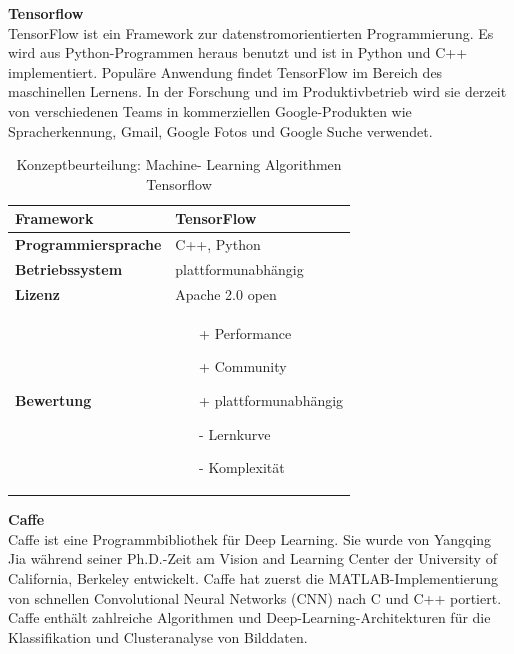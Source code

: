 \documentclass[../../main.tex]{subfiles}
\begin{document}
        \textbf{Tensorflow}\\
        TensorFlow ist ein Framework zur datenstromorientierten Programmierung. Es wird aus Python-Programmen heraus benutzt und ist in Python und C++ implementiert. Populäre Anwendung findet TensorFlow im Bereich des maschinellen Lernens. In der Forschung und im Produktivbetrieb wird sie derzeit von verschiedenen Teams in kommerziellen Google-Produkten wie Spracherkennung, Gmail, Google Fotos und Google Suche verwendet.

        \begin{flushleft}
            \begin{table}[h]
            \begin{tabular}{ | l | p{11cm} |}
            \hline
            \textbf{Framework} & TensorFlow \\ \hline
            \textbf{Programmiersprache} & C++, Python \\ \hline
            \textbf{Betriebssystem} & plattformunabhängig \\ \hline
            \textbf{Lizenz} & Apache 2.0 open \\ \hline
            \textbf{Bewertung} &  \begin{itemize}
                                    \item[+] Performance
                                    \item[+] Community
                                    \item[+] plattformunabhängig 
                                    \item[-] Lernkurve
                                    \item[-] Komplexität 
                                  \end{itemize} \\ \hline
            \end{tabular}
            \caption{Konzeptbeurteilung: Machine- Learning Algorithmen Tensorflow}
            \label{tab:konzept_ML_Tensorflow}
            \end{table}
        \end{flushleft}
        \pagebreak

        \textbf{Caffe}\\
        Caffe ist eine Programmbibliothek für Deep Learning. Sie wurde von Yangqing Jia während seiner Ph.D.-Zeit am Vision and Learning Center der University of California, Berkeley entwickelt. Caffe hat zuerst die MATLAB-Implementierung von schnellen Convolutional Neural Networks (CNN) nach C und C++ portiert. Caffe enthält zahlreiche Algorithmen und Deep-Learning-Architekturen für die Klassifikation und Clusteranalyse von Bilddaten.
        
\end{document}
